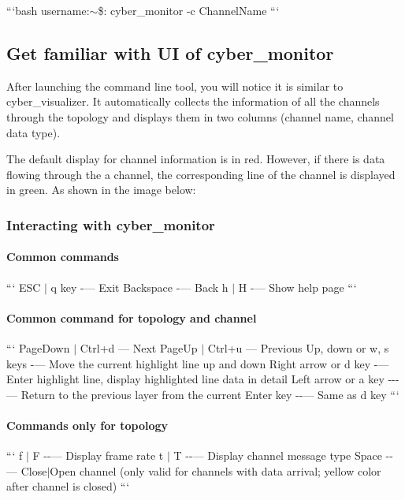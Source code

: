 ```bash username\-:$\sim$\$\-: cyber\-\_\-monitor -\/c Channel\-Name ```

\subsection*{Get familiar with U\-I of cyber\-\_\-monitor}

After launching the command line tool, you will notice it is similar to cyber\-\_\-visualizer. It automatically collects the information of all the channels through the topology and displays them in two columns (channel name, channel data type).

The default display for channel information is in red. However, if there is data flowing through the a channel, the corresponding line of the channel is displayed in green. As shown in the image below\-:



\subsubsection*{Interacting with cyber\-\_\-monitor}

\paragraph*{Common commands}

``` E\-S\-C $\vert$ q key -\/--- Exit Backspace -\/--- Back h $\vert$ H -\/--- Show help page ```

\paragraph*{Common command for topology and channel}

``` Page\-Down $\vert$ Ctrl+d --- Next Page\-Up $\vert$ Ctrl+u --- Previous Up, down or w, s keys -\/--- Move the current highlight line up and down Right arrow or d key -\/--- Enter highlight line, display highlighted line data in detail Left arrow or a key -\/-\/-\/--- Return to the previous layer from the current Enter key -\/-\/--- Same as d key ```

\paragraph*{Commands only for topology}

``` f $\vert$ F -\/-\/--- Display frame rate t $\vert$ T -\/-\/--- Display channel message type Space -\/-\/--- Close$\vert$\-Open channel (only valid for channels with data arrival; yellow color after channel is closed) ```

